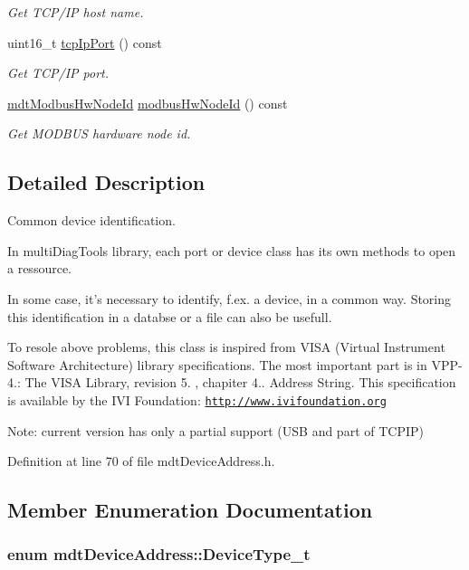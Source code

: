 \begin{DoxyCompactItemize}
\begin{DoxyCompactList}\small\item\em Get T\-C\-P/\-I\-P host name. \end{DoxyCompactList}\item 
uint16\-\_\-t \hyperlink{classmdt_device_address_a84932f54a32ff54ca61c698a8e0cf0fc}{tcp\-Ip\-Port} () const 
\begin{DoxyCompactList}\small\item\em Get T\-C\-P/\-I\-P port. \end{DoxyCompactList}\item 
\hyperlink{classmdt_modbus_hw_node_id}{mdt\-Modbus\-Hw\-Node\-Id} \hyperlink{classmdt_device_address_a8afd94a40f2c32011e759c4cff79d813}{modbus\-Hw\-Node\-Id} () const 
\begin{DoxyCompactList}\small\item\em Get M\-O\-D\-B\-U\-S hardware node id. \end{DoxyCompactList}\end{DoxyCompactItemize}


\subsection{Detailed Description}
Common device identification. 

In multi\-Diag\-Tools library, each port or device class has its own methods to open a ressource.

In some case, it's necessary to identify, f.\-ex. a device, in a common way. Storing this identification in a databse or a file can also be usefull.

To resole above problems, this class is inspired from V\-I\-S\-A (Virtual Instrument Software Architecture) library specifications. The most important part is in V\-P\-P-\/4.\-: The V\-I\-S\-A Library, revision 5. , chapiter 4.. Address String. This specification is available by the I\-V\-I Foundation\-: \href{http://www.ivifoundation.org}{\tt http\-://www.\-ivifoundation.\-org}

Note\-: current version has only a partial support (U\-S\-B and part of T\-C\-P\-I\-P) 

Definition at line 70 of file mdt\-Device\-Address.\-h.



\subsection{Member Enumeration Documentation}
\hypertarget{classmdt_device_address_a8e776267826886cd846fb2d75b9b7b2b}{
\subsubsection[{Device\-Type\-\_\-t}]{\setlength{\rightskip}{0pt plus 5cm}enum {\bf mdt\-Device\-Address\-::\-Device\-Type\-\_\-t}\hspace{0.3cm}{\ttfamily [strong]}}}\label{classmdt_device_address_a8e776267826886cd846fb2d75b9b7b2b}


